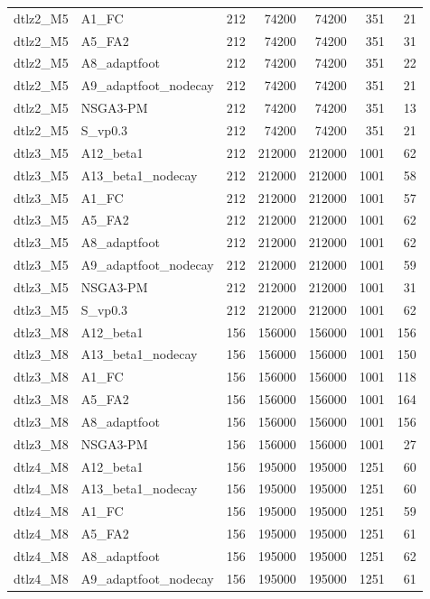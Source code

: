 \begin{tabular}{llrrrrr}
dtlz2_M5 & A1_FC & 212 & 74200 & 74200 & 351 & 21 \\
dtlz2_M5 & A5_FA2 & 212 & 74200 & 74200 & 351 & 31 \\
dtlz2_M5 & A8_adaptfoot & 212 & 74200 & 74200 & 351 & 22 \\
dtlz2_M5 & A9_adaptfoot_nodecay & 212 & 74200 & 74200 & 351 & 21 \\
dtlz2_M5 & NSGA3-PM & 212 & 74200 & 74200 & 351 & 13 \\
dtlz2_M5 & S_vp0.3 & 212 & 74200 & 74200 & 351 & 21 \\
dtlz3_M5 & A12_beta1 & 212 & 212000 & 212000 & 1001 & 62 \\
dtlz3_M5 & A13_beta1_nodecay & 212 & 212000 & 212000 & 1001 & 58 \\
dtlz3_M5 & A1_FC & 212 & 212000 & 212000 & 1001 & 57 \\
dtlz3_M5 & A5_FA2 & 212 & 212000 & 212000 & 1001 & 62 \\
dtlz3_M5 & A8_adaptfoot & 212 & 212000 & 212000 & 1001 & 62 \\
dtlz3_M5 & A9_adaptfoot_nodecay & 212 & 212000 & 212000 & 1001 & 59 \\
dtlz3_M5 & NSGA3-PM & 212 & 212000 & 212000 & 1001 & 31 \\
dtlz3_M5 & S_vp0.3 & 212 & 212000 & 212000 & 1001 & 62 \\
dtlz3_M8 & A12_beta1 & 156 & 156000 & 156000 & 1001 & 156 \\
dtlz3_M8 & A13_beta1_nodecay & 156 & 156000 & 156000 & 1001 & 150 \\
dtlz3_M8 & A1_FC & 156 & 156000 & 156000 & 1001 & 118 \\
dtlz3_M8 & A5_FA2 & 156 & 156000 & 156000 & 1001 & 164 \\
dtlz3_M8 & A8_adaptfoot & 156 & 156000 & 156000 & 1001 & 156 \\
dtlz3_M8 & NSGA3-PM & 156 & 156000 & 156000 & 1001 & 27 \\
dtlz4_M8 & A12_beta1 & 156 & 195000 & 195000 & 1251 & 60 \\
dtlz4_M8 & A13_beta1_nodecay & 156 & 195000 & 195000 & 1251 & 60 \\
dtlz4_M8 & A1_FC & 156 & 195000 & 195000 & 1251 & 59 \\
dtlz4_M8 & A5_FA2 & 156 & 195000 & 195000 & 1251 & 61 \\
dtlz4_M8 & A8_adaptfoot & 156 & 195000 & 195000 & 1251 & 62 \\
dtlz4_M8 & A9_adaptfoot_nodecay & 156 & 195000 & 195000 & 1251 & 61 \\

\end{tabular}
